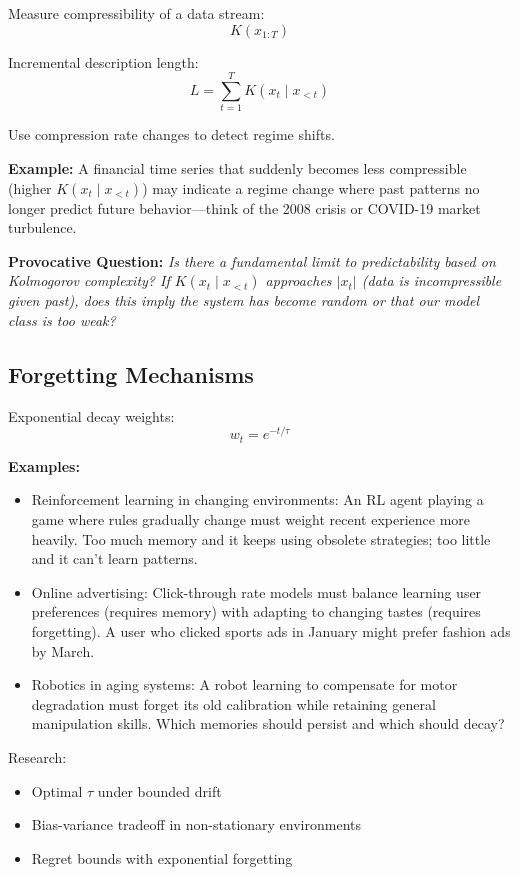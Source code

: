   Measure compressibility of a data stream:
  $$
    K(x_{1:T})
  $$

  Incremental description length:
  $$
    L = \sum_{t=1}^{T}K(x_{t}\mid x_{<t})
  $$

  Use compression rate changes to detect regime shifts.

  \textbf{Example:} A financial time series that suddenly becomes less
  compressible (higher $K(x_{t}\mid x_{<t})$) may indicate a regime
  change where past patterns no longer predict future behavior—think of
  the 2008 crisis or COVID-19 market turbulence.

  \textbf{Provocative Question:} \textit{Is there a fundamental limit to
  predictability based on Kolmogorov complexity? If $K(x_{t}\mid x_{<t})$
  approaches $|x_{t}|$ (data is incompressible given past), does this
  imply the system has become random or that our model class is too weak?}

  \subsection*{Forgetting Mechanisms}

  Exponential decay weights:
  $$
    w_{t}= e^{-t/\tau}
  $$

  \textbf{Examples:}
  \begin{itemize}
    \item Reinforcement learning in changing environments: An RL agent
      playing a game where rules gradually change must weight recent
      experience more heavily. Too much memory and it keeps using obsolete
      strategies; too little and it can't learn patterns.

    \item Online advertising: Click-through rate models must balance
      learning user preferences (requires memory) with adapting to
      changing tastes (requires forgetting). A user who clicked sports ads
      in January might prefer fashion ads by March.

    \item Robotics in aging systems: A robot learning to compensate for
      motor degradation must forget its old calibration while retaining
      general manipulation skills. Which memories should persist and which
      should decay?
  \end{itemize}

  Research:
  \begin{itemize}
    \item Optimal $\tau$ under bounded drift

    \item Bias-variance tradeoff in non-stationary environments

    \item Regret bounds with exponential forgetting
  \end{itemize}

